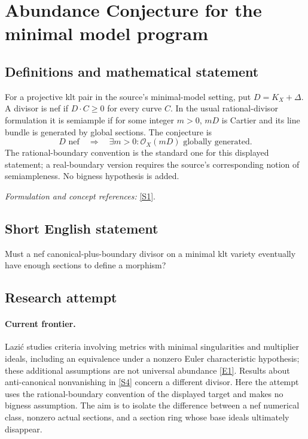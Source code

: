 \documentclass[11pt,a4paper]{article}
\numberwithin{equation}{section}
\newcommand{\sref}[2]{\hyperlink{source:#1:#2}{[S#2]}}
\newcommand{\eref}[2]{\hyperlink{extra:#1:#2}{[E#2]}}
\newif\ifshowcatalogue
\newcommand{\cataloguescope}[1]{\ifshowcatalogue
 \paragraph{Exact scope in the supplied catalogue.}
 \begin{quote}\small #1\end{quote}\fi}
\begin{document}
\setcounter{section}{0}
\section*{\texorpdfstring{Abundance Conjecture for the minimal model program}{Abundance Conjecture for the minimal model program}}\label{statement}
\subsection{Definitions and mathematical statement}
For a projective klt pair in the source's minimal-model setting, put $D=K_X+\Delta$. A divisor is nef if $D\cdot C\ge0$ for every curve $C$. In the usual rational-divisor formulation it is semiample if for some integer $m>0$, $mD$ is Cartier and its line bundle is generated by global sections. The conjecture is
\[
 D\text{ nef}\quad\Longrightarrow\quad \exists m>0:\mathcal O_X(mD)\text{ globally generated}.
\]
The rational-boundary convention is the standard one for this displayed statement; a real-boundary version requires the source's corresponding notion of semiampleness. No bigness hypothesis is added.
\par\smallskip\textit{Formulation and concept references:} \sref{statement}{1}.
\cataloguescope{Prove that for every minimal projective Kawamata log terminal pair (X,Delta), the nef adjoint divisor K\_X+Delta is semiample.}
\subsection{Short English statement}
Must a nef canonical-plus-boundary divisor on a minimal klt variety eventually have enough sections to define a morphism?
\subsection{Research attempt}

\paragraph{Current frontier.}
Lazi\'c studies criteria involving metrics with minimal singularities and
multiplier ideals, including an equivalence under a nonzero Euler
characteristic hypothesis; these additional assumptions are not universal
abundance \eref{statement}{1}. Results about anti-canonical nonvanishing in
\sref{statement}{4} concern a different divisor. Here the attempt uses the
rational-boundary convention of the displayed target and makes no bigness
assumption. The aim is to isolate the difference between a nef numerical
class, nonzero actual sections, and a section ring whose base ideals
ultimately disappear.
\end{document}
